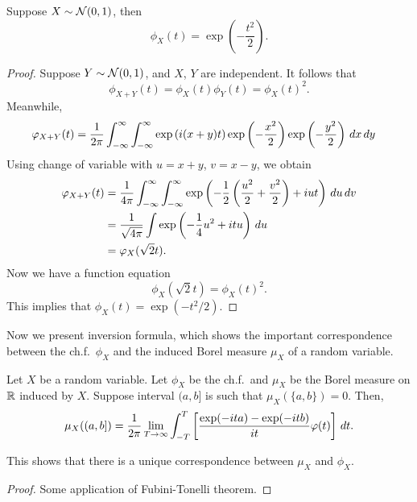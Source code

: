 \documentclass[a4paper]{article}
\begin{document}
\begin{prop}
  Suppose $X \sim \mathcal{N} (0, 1)$, then 
  \[
  \phi_X (t) = \exp \left( - \frac{t^2}{2} \right).
  \]
\end{prop}

\begin{proof}
  Suppose $Y \sim \mathcal{N} (0, 1)$, and $X$, $Y$ are independent.
  It follows that 
  \[
  \phi_{X + Y} (t) = \phi_X (t) \phi_Y (t) = \phi_X (t)^2.
  \]
  Meanwhile,
  \begin{align*}
    \varphi_{X + Y} (t) 
    &= \frac{1}{2 \pi} \int_{-\infty}^\infty \int_{-\infty}^\infty 
    \exp \left( i (x + y) t \right) 
    \exp \left( - \frac{x^2}{2} \right)
    \exp \left( - \frac{y^2}{2} \right) 
    \, d x \, d y
  \end{align*}
  Using change of variable with $u = x + y$, $v = x - y$, we obtain 
  \begin{align*}
    \varphi_{X + Y} (t) 
    &= \frac{1}{4 \pi} \int_{-\infty}^\infty \int_{-\infty}^\infty 
    \exp \left( -\frac{1}{2} \left( \frac{u^2}{2} 
    + \frac{v^2}{2} \right) + i u t \right)
    \, d u \, d v \\
    &= \frac{1}{\sqrt{4 \pi}} \int \exp 
    \left( - \frac{1}{4} u^2 + i t u \right) \, d u \\
    &= \varphi_X (\sqrt{2} t).
  \end{align*}
  Now we have a function equation
  \[
  \phi_X (\sqrt{2} t) = \phi_X (t)^2.
  \]
  This implies that $\phi_X (t) = \exp (- t^2 / 2)$.

\end{proof}


Now we present inversion formula, which shows the important correspondence
between the ch.f.\ $\phi_X$ and the induced Borel measure $\mu_X$ 
of a random variable.

\begin{thm}
  Let $X$ be a random variable. Let $\phi_X$ be the ch.f.\ and $\mu_X$
  be the Borel measure on $\mathbb{R}$ induced by $X$. Suppose interval $(a, b]$ 
  is such that $\mu_X (\{ a, b \}) = 0$. Then, 
  \[
  \mu_X ((a, b]) = 
  \frac{1}{2 \pi} \lim_{T \to \infty}
  \int_{-T}^T \left[ \frac{\exp (- i t a) - \exp (- i t b)}{i t} \varphi 
  (t) \right] \, d t.
  \]

  This shows that there is a unique correspondence between $\mu_X$ and 
  $\phi_X$.
\end{thm} 

\begin{proof}
  Some application of Fubini-Tonelli theorem.
\end{proof}
\end{document}
